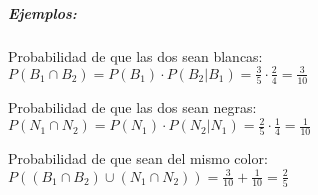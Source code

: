

%



\subparagraph{Ejemplos:}\begin{list}{-}{}
\item Probabilidad de que las dos sean blancas:\\
$P(B_1\cap B_2)=P(B_1)\cdot P(B_2|B_1)=\frac{3}{5}\cdot\frac{2}{4}=\frac{3}{10}$
\item Probabilidad de que las dos sean negras:\\ 
$P(N_1\cap N_2)=P(N_1)\cdot P(N_2|N_1)=\frac{2}{5}\cdot\frac{1}{4}=\frac{1}{10}$
\item Probabilidad de que sean del mismo color: \\
$P((B_1\cap B_2)\cup (N_1\cap N_2))=\frac{3}{10}+\frac{1}{10}=\frac{2}{5}$
\end{list}


